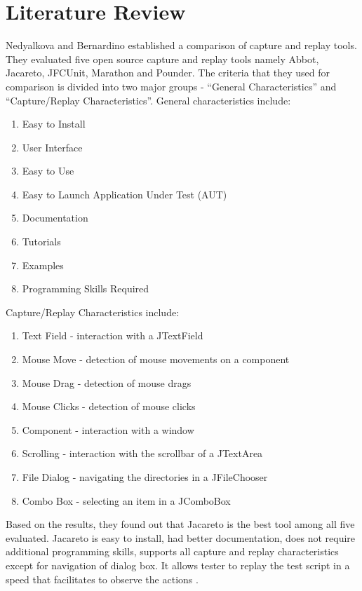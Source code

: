 \documentclass[12pt,journal]{IEEEtran}
\begin{document}
\section{Literature Review}
Nedyalkova and  Bernardino \cite{comparison survey} established a comparison of capture and replay tools. They evaluated five open source capture and replay tools namely Abbot, Jacareto, JFCUnit, Marathon and Pounder. The criteria that they used for comparison is divided into two major groups - ``General Characteristics'' and ``Capture/Replay Characteristics''. General characteristics include:
\begin{enumerate}
\item Easy to Install
\item User Interface
\item Easy to Use
\item Easy to Launch Application Under Test (AUT)
\item Documentation
\item Tutorials
\item Examples
\item Programming Skills Required
\end{enumerate}
Capture/Replay Characteristics include:
\begin{enumerate}
\item Text Field - interaction with a JTextField
\item Mouse Move - detection of mouse movements on a component
\item Mouse Drag - detection of mouse drags
\item Mouse Clicks - detection of mouse clicks
\item Component - interaction with a window
\item Scrolling - interaction with the scrollbar of a JTextArea
\item File Dialog - navigating the directories in a JFileChooser
\item Combo Box - selecting an item in a JComboBox
\end{enumerate}
Based on the results, they found out that Jacareto is the best tool among all five evaluated. Jacareto is easy to install, had better documentation, does not require additional programming skills, supports all capture and replay characteristics except for navigation of dialog box. It allows tester to replay the test script in a speed that facilitates to observe the actions \cite{Nedyalkova:2013:OSC:2494444.2494464}.
\end{document}
